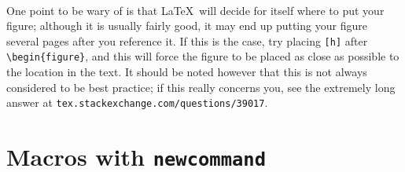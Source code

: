 \documentclass[11pt]{article}
\begin{document}
\paragraph{}
 One point to be wary of is that \LaTeX\ will decide for itself where to put your figure; although it is usually fairly good, it may end up putting your figure several pages after you reference it. If this is the case, try placing \verb$[h]$ after \verb$\begin{figure}$, and this will force the figure to be placed as close as possible to the location in the text.  It should be noted however that this is not always considered to be best practice; if this really concerns you, see the extremely long answer at \verb$tex.stackexchange.com/questions/39017$.

\section{Macros with \texttt{newcommand}}
\end{document}
